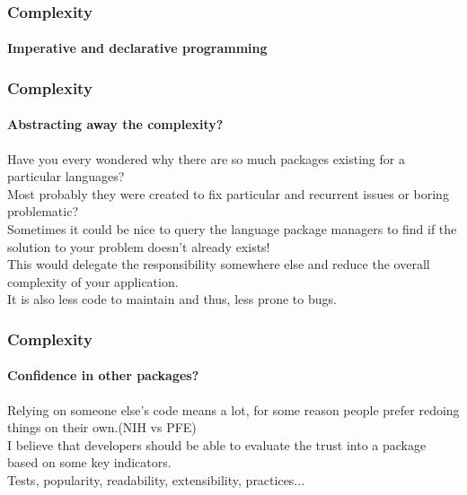 \begin{frame}
    \frametitle{Complexity}
    \framesubtitle{Imperative and declarative programming}


\pause



\end{frame}

\begin{frame}
    \frametitle{Complexity}
    \framesubtitle{Abstracting away the complexity?}

    Have you every wondered why there are so much packages existing for a
    particular languages?\\
    \pause
    Most probably they were created to fix particular and recurrent issues or
    boring problematic?\\
    \pause
    Sometimes it could be nice to query the language package managers to find if
    the solution to your problem doesn't already exists!\\
    \pause
    This would delegate the responsibility somewhere else and reduce the overall
    complexity of your application.\\
    \pause
    It is also less code to maintain and thus, less prone to bugs.

\end{frame}

\begin{frame}
    \frametitle{Complexity}
    \framesubtitle{Confidence in other packages?}

    Relying on someone else's code means a lot, for some reason people prefer
    redoing things on their own.(NIH vs PFE)\\
    \pause
    \vfill
    I believe that developers should be able to evaluate the trust into a
    package based on some key indicators.\\
    \pause
    \vfill
    Tests, popularity, readability, extensibility, practices...
\end{frame}

